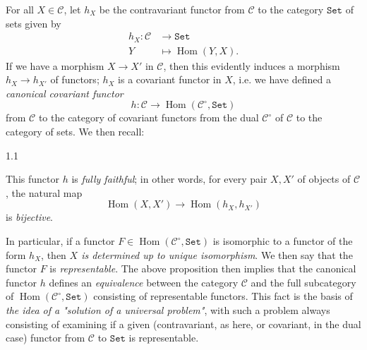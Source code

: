  For all \(X\in \mathcal {C}\), let \(h_X\) be the contravariant functor from \(\mathcal {C}\) to the category \(\mathtt {Set}\) of sets given by
  \[     \begin {aligned}       h_X\colon  \mathcal {C} &\to  \mathtt {Set}     \\Y&\mapsto  \operatorname {Hom}(Y,X).     \end {aligned}   \]
  If we have a morphism \(X\to  X'\) in \(\mathcal {C}\), then this evidently induces a morphism \(h_X\to  h_{X'}\) of functors;
  \(h_X\) is a covariant functor in \(X\), i.e. we have defined a \emph{canonical covariant functor}
  \[     h\colon  \mathcal {C} \to  \operatorname {Hom}(\mathcal {C}^\circ ,\mathtt {Set})   \]
  from \(\mathcal {C}\) to the category of covariant functors from the dual \(\mathcal {C}^\circ \) of \(\mathcal {C}\) to the category of sets.
  We then recall:\begin{proposition}{1.1}\label{fga3.ii-a.1-proposition-1.1}\skipsinglepar\par{}This functor \(h\) is \emph{fully faithful};
    in other words, for every pair \(X,X'\) of objects of \(\mathcal {C}\), the natural map
    \[       \operatorname {Hom}(X,X') \to  \operatorname {Hom}(h_X,h_{X'})     \]
    is \emph{bijective}.\end{proposition}\par{}In particular, if a functor \(F\in \operatorname {Hom}(\mathcal {C}^\circ ,\mathtt {Set})\) is isomorphic to a functor of the form \(h_X\), then \emph{\(X\) is determined up to unique isomorphism}.
  We then say that the functor \(F\) is \emph{representable}.
  The above proposition then implies that the canonical functor \(h\) defines an \emph{equivalence} between the category \(\mathcal {C}\) and the full subcategory of \(\operatorname {Hom}(\mathcal {C}^\circ ,\mathtt {Set})\) consisting of representable functors.
  This fact is the basis of \emph{the idea of a "solution of a universal problem"}, with such a problem always consisting of examining if a given (contravariant, as here, or covariant, in the dual case) functor from \(\mathcal {C}\) to \(\mathtt {Set}\) is representable.
  
